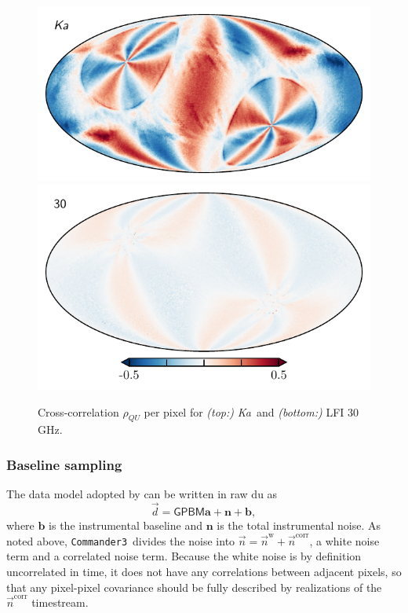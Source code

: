 \documentclass[twocolumn]{../../common/aa}
\def\commanderthree{\texttt{Commander3}}
\newcommand{\n}[0]{\vec{n}}
\newcommand{\Ka}[0]{\textit{Ka}}
\newcommand{\data}{\vec d}
\begin{document}
\begin{figure}
	\centering
	\includegraphics[width=\columnwidth]{figures/rho_QU_Ka.pdf}\\
	\includegraphics[width=\columnwidth]{figures/rho_QU_30.pdf}
	\caption{Cross-correlation $\rho_{QU}$ per pixel for \textit{(top:)} \Ka\ and \textit{(bottom:)} LFI 30\,GHz.}
	\label{fig:cross_cor}
\end{figure}



\subsubsection{Baseline sampling}
\label{ssec:baseline}

The data model adopted by \citet{hinshaw2003a} can be written in raw du as
\begin{equation}
	\data = \mathsf{GPBM}\boldsymbol a+\boldsymbol n+\boldsymbol b,
\end{equation}
where $\boldsymbol b$ is the instrumental baseline and $\boldsymbol n$ is the
total instrumental noise. As noted above, \commanderthree\ divides
the noise into $\n=\n^\mathrm w+\n^\mathrm{corr}$, a white noise term and a
correlated noise term. Because the white noise is by definition uncorrelated in time, it does not have any
correlations between adjacent pixels, so that any pixel-pixel covariance should
be fully described by realizations of the $\n^\mathrm{corr}$ timestream.
\end{document}
